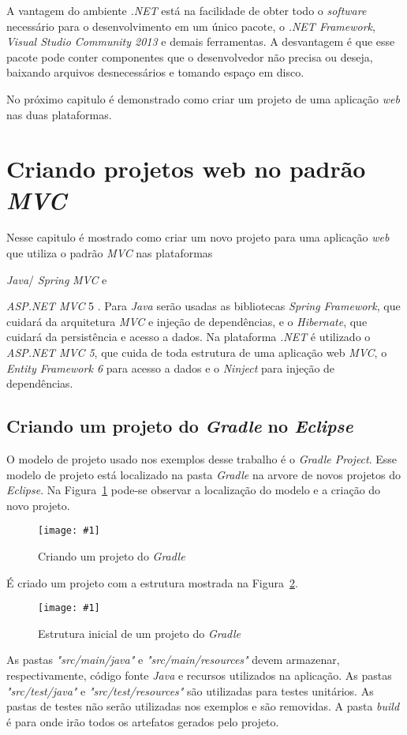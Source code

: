\documentclass[a4paper,12pt]{article}
\newcommand{\anmvc} {
\sigla{ASP.NET MVC} 5
}
\newcommand{\spring} {
\lang{Java}/\est{Spring} \sigla{MVC}
}
\newcommand{\figura}[3] {
	\begin{figure}[ht]
		\centering
		\texttt{[image: \#1]}
		\caption{#2}
		\label{#3}
	\end{figure}
	\FloatBarrier
}
\newcommand{\est}[1] {
\textit{#1}}
\newcommand{\arquivo}[1] {
\textit{#1}}
\newcommand{\sigla}[1] {
\textit{#1}}
\newcommand{\lang}[1] {
\textit{#1}}
\begin{document}
A vantagem do ambiente \sigla{.NET} está na facilidade de obter todo o \est{software} necessário para o desenvolvimento em um único pacote, o \est{.NET Framework}, \est{Visual Studio Community 2013} e demais ferramentas. A desvantagem é que esse pacote pode conter componentes que o desenvolvedor não precisa ou deseja, baixando arquivos desnecessários e tomando espaço em disco.

No próximo capitulo é demonstrado como criar um projeto de uma aplicação \est{web} nas duas plataformas.

\newpage
\section{Criando projetos web no padrão \sigla{MVC}}

Nesse capitulo é mostrado como criar um novo projeto para uma aplicação \est{web} que utiliza o padrão \sigla{MVC} nas plataformas \spring e \anmvc. Para \lang{Java} serão usadas as bibliotecas \est{Spring Framework}, que cuidará da arquitetura \sigla{MVC} e injeção de dependências, e o \est{Hibernate}, que cuidará da persistência e acesso a dados. Na plataforma \sigla{.NET} é utilizado o \sigla{ASP.NET MVC 5}, que cuida de toda estrutura de uma aplicação web \sigla{MVC}, o \est{Entity Framework 6} para acesso a dados e o \est{Ninject} para injeção de dependências.

\subsection{Criando um projeto do \est{Gradle} no \est{Eclipse}}

O modelo de projeto usado nos exemplos desse trabalho é o \est{Gradle Project}. Esse modelo de projeto está localizado na pasta \est{Gradle} na arvore de novos projetos do \est{Eclipse}. Na Figura~\ref{fig:gradleproject} pode-se observar a localização do modelo e a criação do novo projeto.

\figura{gradleproject1.png}{Criando um projeto do \est{Gradle}}{fig:gradleproject}

É criado um projeto com a estrutura mostrada na Figura~\ref{fig:gradletree}.

\figura{gradleproject1.png}{Estrutura inicial de um projeto do \est{Gradle}}{fig:gradletree}

As pastas \arquivo{"src/main/java"} e \arquivo{"src/main/resources"} devem armazenar, respectivamente, código fonte \lang{Java} e recursos utilizados na aplicação.  As pastas \arquivo{"src/test/java"} e \arquivo{"src/test/resources"} são utilizadas para testes unitários. As pastas de testes não serão utilizadas nos exemplos e são removidas. A pasta \est{build} é para onde irão todos os artefatos gerados pelo projeto.
\end{document}
